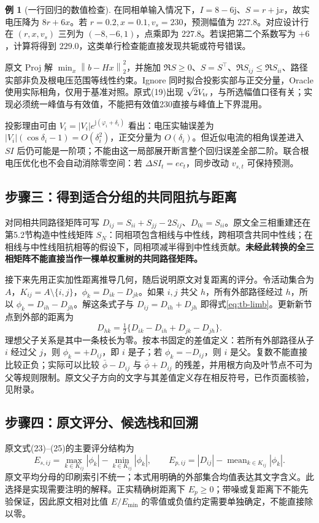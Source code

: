 \documentclass[UTF8,11pt,fontset=fandol,openany,oneside]{ctexbook}
\newcommand{\norm}[1]{\left\lVert#1\right\rVert}
\theoremstyle{definition}
\newtheorem{example}[theorem]{例}
\theoremstyle{remark}
\numberwithin{equation}{chapter}
\begin{document}
\begin{example}[一行回归的数值检查]
在同相单输入情况下，$I=8-6\mathrm j$、$S=r+\mathrm j x$，故实电压降为 $8r+6x$。若 $r=0.2,x=0.1,v_s=230$，预测幅值为 $227.8$。对应设计行在 $(r,x,v_s)$ 三列为 $(-8,-6,1)$，点乘即为 $227.8$。若误把第二个系数写为 $+6$，计算将得到 $229.0$，这类单行检查能直接发现共轭或符号错误。
\end{example}

原文 Proj 解 $\min_x\norm{b-Hx}_2^2$，并施加 $\Re S\geq0$、$S=S^\top$、$\Re S_{ij}\leq\Re S_{ii}$、路径实部非负及根电压范围等线性约束。Ignore 同时拟合投影实部与正交分量，Oracle 使用实际相角，仅用于基准对照。原式(19)出现 $\sqrt2V_{\rm tr}$，与所选幅值口径有关；实现必须统一峰值与有效值，不能把有效值230直接与峰值上下界混用。

投影理由可由 $V_i=|V_i|e^{\mathrm j(\varphi_i+\delta_i)}$ 看出：电压实轴误差为 $|V_i|(\cos\delta_i-1)=O(\delta_i^2)$，正交分量为 $O(\delta_i)$。但近似电流的相角误差进入 $SI$ 后仍可能是一阶项；不能由这一局部展开断言整个回归误差全部二阶。联合根电压优化也不会自动消除零空间：若 $\Delta S I_t=e c_t$，同步改动 $v_{s,t}$ 可保持预测。

\subsection{步骤三：得到适合分组的共同阻抗与距离}
对同相共同路径矩阵可写 $D_{ij}=S_{ii}+S_{jj}-2S_{ij}$、$D_{0i}=S_{ii}$。原文全三相重建还在第5.2节构造中性线矩阵 $S_N$：同相项包含相线与中性线，跨相项含共同中性线；在相线与中性线阻抗相等的假设下，同相项减半得到中性线贡献。\textbf{未经此转换的全三相矩阵不能直接当作一棵单权重树的共同路径矩阵。}

接下来先用正实加性距离推导几何，随后说明原文对复距离的评分。令活动集合为 $A$，$K_{ij}=A\setminus\{i,j\}$，$\phi_k=D_{ik}-D_{jk}$。如果 $i,j$ 共父 $h$，所有外部路径经过 $h$，所以 $\phi_k=D_{ih}-D_{jh}$。解这条式子与 $D_{ij}=D_{ih}+D_{jh}$ 即得式\eqref{eq:tb-limb}。更新新节点到外部的距离为
\begin{equation}
 D_{hk}=\tfrac12\{D_{ik}-D_{ih}+D_{jk}-D_{jh}\}.
 \label{eq:tb-s3-distance-update}
\end{equation}
理想父子关系是其中一条枝长为零。按本书固定的差值定义：若所有外部路径从子 $i$ 经过父 $j$，则 $\phi_k=+D_{ij}$，即 $i$ 是子；若 $\phi_k=-D_{ij}$，则 $i$ 是父。复数不能直接比较正负；实际可以比较 $\bar\phi-D_{ij}$ 与 $\bar\phi+D_{ij}$ 的残差，并用根方向及叶节点不可为父等规则限制。原文父子方向的文字与其差值定义存在相反符号，已作页面核验，见附录。

\subsection{步骤四：原文评分、候选栈和回溯}
原文式(23)--(25)的主要评分结构为
\begin{equation}
 E_{s,ij}=\max_{k\in K_{ij}}|\phi_k|-\min_{k\in K_{ij}}|\phi_k|,
 \qquad E_{p,ij}=|D_{ij}|-\operatorname{mean}_{k\in K_{ij}}|\phi_k|.
 \label{eq:tb-s3-scores}
\end{equation}
原文平均分母的印刷索引不统一；本式用明确的外部集合均值表达其文字含义。此选择是实现需要注明的解释。正实精确树距离下 $E_p\geq0$；带噪或复距离下不能先验保证，因此原文相对比值 $E/E_{\min}$ 的零值或负值约定需要单独确定，不能直接除以零。
\end{document}
